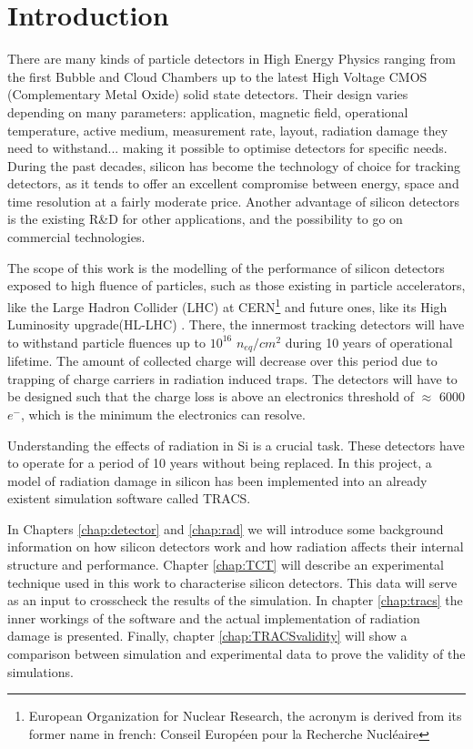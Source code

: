 \clearpage
{}  %
\chapter{Introduction}

There are many kinds of particle detectors in High Energy Physics ranging from the first Bubble and Cloud Chambers up to the latest High Voltage CMOS (Complementary Metal Oxide) solid state detectors. Their design varies depending on many parameters: application, magnetic field, operational temperature, active medium, measurement rate, layout, radiation damage they need to withstand... making it possible to optimise detectors for specific needs. During the past decades, silicon has become the technology of choice for tracking detectors, as it tends to offer an excellent compromise between energy, space and time resolution at a fairly moderate price. Another advantage of silicon detectors is the existing R\&D for other applications, and the possibility to go on commercial technologies.

 The scope of this work is the modelling of the performance of silicon detectors exposed to high fluence of particles, such as those existing in particle accelerators, like the Large Hadron Collider (LHC) at CERN\footnote{European Organization for Nuclear Research, the acronym is derived from its former name in french: Conseil Européen pour la Recherche Nucléaire} and future ones, like its High Luminosity upgrade(HL-LHC) . There, the innermost tracking detectors will have to withstand particle fluences up to $10^{16}$ $n_{eq}/cm^{2}$  during 10 years of operational lifetime. The amount of collected charge will decrease over this period due to trapping of charge carriers in radiation induced traps. The detectors will have to be designed such that the charge loss is above an electronics threshold of $\approx$ 6000 $e^{-}$, which is the minimum the electronics can resolve. 

 Understanding the effects of radiation in Si is a crucial task. These detectors have to operate for a period of 10 years without being replaced. In this project, a model of radiation damage in silicon has been implemented into an already existent simulation software called TRACS\cite{TRACS}. 
 
In Chapters \ref{chap:detector} and \ref{chap:rad} we will introduce some background information on how silicon detectors work and how radiation affects their internal structure and performance. Chapter \ref{chap:TCT} will describe an experimental technique used in this work to characterise silicon detectors. This data will serve as an input to crosscheck the results of the simulation. In chapter \ref{chap:tracs} the inner workings of the software and the actual implementation of radiation damage is presented. Finally, chapter \ref{chap:TRACSvalidity} will show a comparison between simulation and experimental data to prove the validity of the simulations. 

